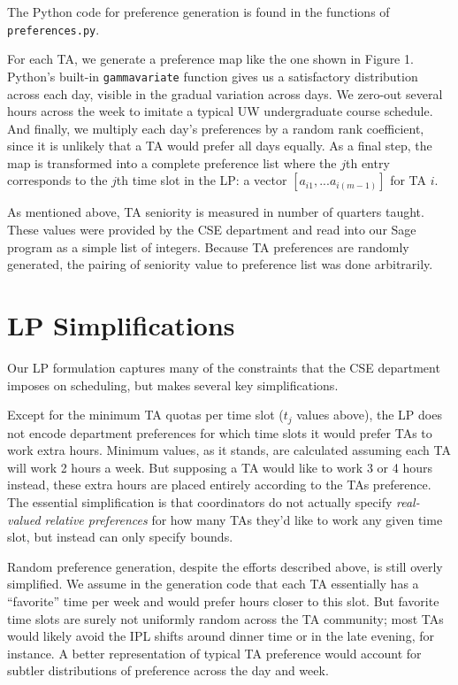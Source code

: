 \documentclass{article}
\begin{document}
\begin{multicols}{2}
The Python code for preference generation is found in the functions of \texttt{preferences.py}.

For each TA, we generate a preference map like the one shown in Figure 1. Python's built-in \texttt{gammavariate} function gives us a satisfactory distribution across each day, visible in the gradual variation across days. We zero-out several hours across the week to imitate a typical UW undergraduate course schedule. And finally, we multiply each day's preferences by a random rank coefficient, since it is unlikely that a TA would prefer all days equally. As a final step, the map is transformed into a complete preference list where the $j$th entry corresponds to the $j$th time slot in the LP: a vector $[a_{i1}, ... a_{i(m-1)}]$ for TA $i$.

As mentioned above, TA seniority is measured in number of quarters taught. These values were provided by the CSE department and read into our Sage program as a simple list of integers. Because TA preferences are randomly generated, the pairing of seniority value to preference list was done arbitrarily.

\section*{LP Simplifications}

Our LP formulation captures many of the constraints that the CSE department imposes on scheduling, but makes several key simplifications.

Except for the minimum TA quotas per time slot ($t_j$ values above), the LP does not encode department preferences for which time slots it would prefer TAs to work extra hours. Minimum values, as it stands, are calculated assuming each TA will work 2 hours a week. But supposing a TA would like to work 3 or 4 hours instead, these extra hours are placed entirely according to the TAs preference. The essential simplification is that coordinators do not actually specify \textit{real-valued relative preferences} for how many TAs they'd like to work any given time slot, but instead can only specify bounds.

Random preference generation, despite the efforts described above, is still overly simplified. We assume in the generation code that each TA essentially has a ``favorite'' time per week and would prefer hours closer to this slot. But favorite time slots are surely not uniformly random across the TA community; most TAs would likely avoid the IPL shifts around dinner time or in the late evening, for instance. A better representation of typical TA preference would account for subtler distributions of preference across the day and week.


\end{multicols}
\end{document}
